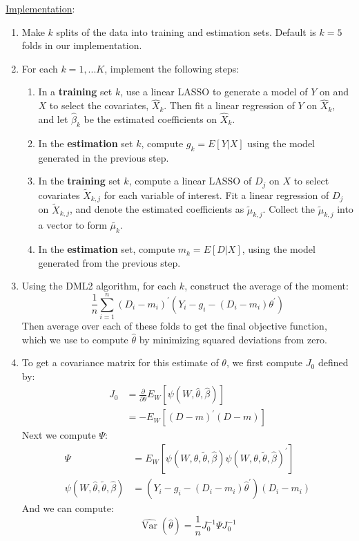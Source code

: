 \documentclass[11pt]{article}
\begin{document}
\noindent \underline{Implementation}:
\begin{enumerate}
	\item Make $k$  splits of the data into training and estimation sets. Default is $k = 5$ folds in our implementation.
	\item For each $k = 1, ... K$, implement the following steps:
  \begin{enumerate}
    \item In a \textbf{training} set $k$, use a linear LASSO to generate a model of  $Y$ on and $X$ to select the covariates, $\hat{X}_k$. Then fit a linear regression of $Y$ on $\hat{X}_k$, and let $\hat{\beta}_k$ be the estimated coefficients on $\hat{X}_k$.
  	\item In the \textbf{estimation} set $k$, compute $g_k = E[Y|X]$ using the model generated in the previous step.
  	\item In the \textbf{training} set $k$, compute a linear LASSO of $D_j$ on $X$ to select covariates $\tilde{X}_{k,j}$ for each variable of interest. Fit a linear regression of $D_j$ on $\tilde{X}_{k,j}$, and denote the estimated coefficients as $\tilde{\mu}_{k,j}$. Collect the $\tilde{\mu}_{k,j}$ into a vector to form $\tilde{\mu_k}$.
  	\item In the \textbf{estimation} set, compute $m_k = E[D|X]$, using the model generated from the previous step.
  \end{enumerate}
	\item Using the DML2 algorithm, for each $k$, construct the average of the moment:
	$$\frac{1}{n} \sum_{i=1}^{n} (D_i - m_{i})^\prime\left({Y}_{i}- g_i -(D_{i} - m_i) \theta^{\prime}\right)$$
	Then average over each of these folds to get the final objective function, which we use to compute $\hat{\theta}$ by minimizing squared deviations from zero.
	\item To get a covariance matrix for this estimate of $\theta$, we first compute $J_0$ defined by:
	$$
	\begin{aligned}
	J_{0} &=\frac{\partial}{\partial \theta} E_{W}\left[ \psi(W, \hat{\theta}, \hat{\beta}) \right]\\
	&=-E_{W}\left[(D-m)^{\prime} (D-m)\right]
	\end{aligned}$$
	Next we compute $\Psi:$
	$$
	\begin{aligned}
	\Psi &=E_{W}\left[\psi(W, \theta, \tilde{\theta}, \hat{\beta}) \psi(W, \theta, \tilde{\theta}, \hat{\beta})^{\prime}\right] \\
	\psi(W, \hat{\theta}, \tilde{\theta}, \hat{\beta}) &= (Y_{i}- g_i - (D_{i} - m_i)\hat{\theta}^{\prime}) (D_i - m_i)
	\end{aligned}
	$$
	And we can compute:
	$$\hat{\operatorname{Var}}(\hat{\theta})=\frac{1}{n} J_{0}^{-1} \Psi J_{0}^{-1}$$
\end{enumerate}
\end{document}
